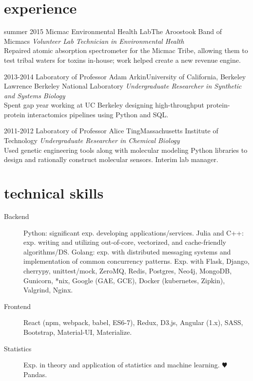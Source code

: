 \documentclass[11pt]{friggeri-cv}
\begin{document}

\section{experience}
\begin{entrylist}
\entry
{summer 2015}
{Micmac Environmental Health Lab}{The Aroostook Band of Micmacs}
{\emph{Volunteer Lab Technician in Environmental Health} \\
Repaired atomic absorption spectrometer for the Micmac Tribe, allowing them to test tribal waters for toxins in-house; work helped create a new revenue engine.}

\entry
{2013-2014}
{Laboratory of Professor Adam Arkin}{University of California, Berkeley\\ {\null} \hfill {Lawrence Berkeley National Laboratory}}
{\emph{Undergraduate Researcher in Synthetic and Systems Biology}\\
Spent gap year working at UC Berkeley designing high-throughput protein-protein interactomics pipelines using Python and SQL.}

\entry
{2011-2012}
{Laboratory of Professor Alice Ting}{Massachusetts Institute of Technology}
{\emph{Undergraduate Researcher in Chemical Biology} \\
Used genetic engineering tools along with molecular modeling Python libraries to design and rationally construct molecular sensors. Interim lab manager.}
\end{entrylist}


\section{technical skills}
\begin{description}
\item[Backend] Python: significant exp. developing applications/services. Julia and C++: exp. writing and utilizing out-of-core, vectorized, and cache-friendly algorithms/DS. Golang: exp. with distributed messaging systems and implementation of common concurrency patterns. Exp. with Flask, Django, cherrypy, 
unittest/mock,
ZeroMQ,
Redis,
Postgres,
Neo4j,
MongoDB,
Gunicorn,
*nix,
Google (GAE, GCE),
Docker (kubernetes, Zipkin),
Valgrind,
Nginx.
\item[Frontend]
React (npm, webpack, babel, ES6-7),
Redux,
D3.js,
Angular (1.x),
SASS,
Bootstrap,
Material-UI,
Materialize.
\item[Statistics] Exp. in theory and application of statistics and machine learning. {\color{red} $\varheartsuit$} Pandas.
\end{description}
\end{document}
